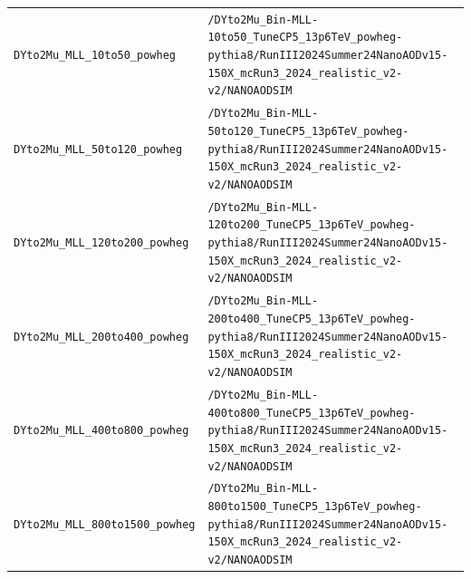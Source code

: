 \begin{longtable}{@{}>{\RaggedRight\arraybackslash}p{} >{\RaggedRight\arraybackslash}p{}@{}}
\addlinespace[2pt]
\texttt{DYto2Mu\_\allowbreak{}MLL\_\allowbreak{}10to50\_\allowbreak{}powheg} & \texttt{/\allowbreak{}DYto2Mu\_\allowbreak{}Bin-\allowbreak{}MLL-\allowbreak{}10to50\_\allowbreak{}TuneCP5\_\allowbreak{}13p6TeV\_\allowbreak{}powheg-\allowbreak{}pythia8/\allowbreak{}RunIII2024Summer24NanoAODv15-\allowbreak{}150X\_\allowbreak{}mcRun3\_\allowbreak{}2024\_\allowbreak{}realistic\_\allowbreak{}v2-\allowbreak{}v2/\allowbreak{}NANOAODSIM} \\
\addlinespace[2pt]
\texttt{DYto2Mu\_\allowbreak{}MLL\_\allowbreak{}50to120\_\allowbreak{}powheg} & \texttt{/\allowbreak{}DYto2Mu\_\allowbreak{}Bin-\allowbreak{}MLL-\allowbreak{}50to120\_\allowbreak{}TuneCP5\_\allowbreak{}13p6TeV\_\allowbreak{}powheg-\allowbreak{}pythia8/\allowbreak{}RunIII2024Summer24NanoAODv15-\allowbreak{}150X\_\allowbreak{}mcRun3\_\allowbreak{}2024\_\allowbreak{}realistic\_\allowbreak{}v2-\allowbreak{}v2/\allowbreak{}NANOAODSIM} \\
\addlinespace[2pt]
\texttt{DYto2Mu\_\allowbreak{}MLL\_\allowbreak{}120to200\_\allowbreak{}powheg} & \texttt{/\allowbreak{}DYto2Mu\_\allowbreak{}Bin-\allowbreak{}MLL-\allowbreak{}120to200\_\allowbreak{}TuneCP5\_\allowbreak{}13p6TeV\_\allowbreak{}powheg-\allowbreak{}pythia8/\allowbreak{}RunIII2024Summer24NanoAODv15-\allowbreak{}150X\_\allowbreak{}mcRun3\_\allowbreak{}2024\_\allowbreak{}realistic\_\allowbreak{}v2-\allowbreak{}v2/\allowbreak{}NANOAODSIM} \\
\addlinespace[2pt]
\texttt{DYto2Mu\_\allowbreak{}MLL\_\allowbreak{}200to400\_\allowbreak{}powheg} & \texttt{/\allowbreak{}DYto2Mu\_\allowbreak{}Bin-\allowbreak{}MLL-\allowbreak{}200to400\_\allowbreak{}TuneCP5\_\allowbreak{}13p6TeV\_\allowbreak{}powheg-\allowbreak{}pythia8/\allowbreak{}RunIII2024Summer24NanoAODv15-\allowbreak{}150X\_\allowbreak{}mcRun3\_\allowbreak{}2024\_\allowbreak{}realistic\_\allowbreak{}v2-\allowbreak{}v2/\allowbreak{}NANOAODSIM} \\
\addlinespace[2pt]
\texttt{DYto2Mu\_\allowbreak{}MLL\_\allowbreak{}400to800\_\allowbreak{}powheg} & \texttt{/\allowbreak{}DYto2Mu\_\allowbreak{}Bin-\allowbreak{}MLL-\allowbreak{}400to800\_\allowbreak{}TuneCP5\_\allowbreak{}13p6TeV\_\allowbreak{}powheg-\allowbreak{}pythia8/\allowbreak{}RunIII2024Summer24NanoAODv15-\allowbreak{}150X\_\allowbreak{}mcRun3\_\allowbreak{}2024\_\allowbreak{}realistic\_\allowbreak{}v2-\allowbreak{}v2/\allowbreak{}NANOAODSIM} \\
\addlinespace[2pt]
\texttt{DYto2Mu\_\allowbreak{}MLL\_\allowbreak{}800to1500\_\allowbreak{}powheg} & \texttt{/\allowbreak{}DYto2Mu\_\allowbreak{}Bin-\allowbreak{}MLL-\allowbreak{}800to1500\_\allowbreak{}TuneCP5\_\allowbreak{}13p6TeV\_\allowbreak{}powheg-\allowbreak{}pythia8/\allowbreak{}RunIII2024Summer24NanoAODv15-\allowbreak{}150X\_\allowbreak{}mcRun3\_\allowbreak{}2024\_\allowbreak{}realistic\_\allowbreak{}v2-\allowbreak{}v2/\allowbreak{}NANOAODSIM} \\

\end{longtable}
